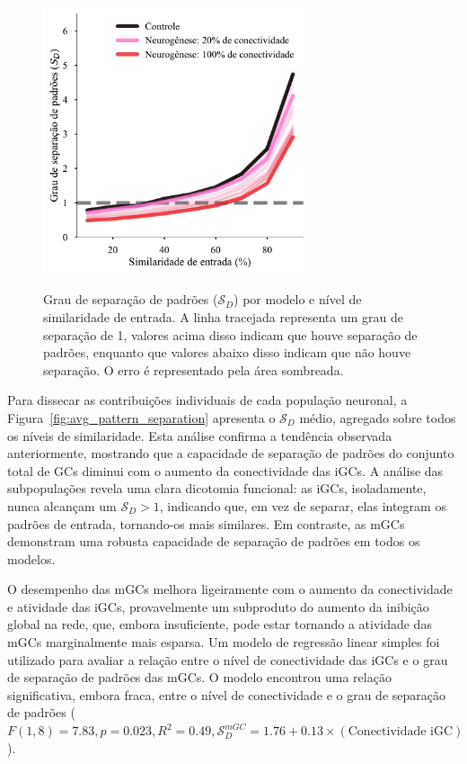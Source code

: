 \begin{figure}
    \centering
    \caption{Grau de separação de padrões ($\mathcal{S}_D$) por modelo e nível de similaridade de entrada. A linha tracejada
    representa um grau de separação de 1, valores acima disso indicam que houve separação de padrões, enquanto que valores abaixo
    disso indicam que não houve separação. O erro é representado pela área sombreada.}
    \includegraphics[width=0.7\textwidth]{figuras/plots/pattern_separation}
    \label{fig:pattern_separation}
\end{figure}

Para dissecar as contribuições individuais de cada população neuronal, a Figura~\ref{fig:avg_pattern_separation} apresenta o
$\mathcal{S}_D$ médio, agregado sobre todos os níveis de similaridade. Esta análise confirma a tendência observada anteriormente,
mostrando que a capacidade de separação de padrões do conjunto total de GCs diminui com o aumento da conectividade das iGCs. A
análise das subpopulações revela uma clara dicotomia funcional: as iGCs, isoladamente, nunca alcançam um $\mathcal{S}_D > 1$,
indicando que, em vez de separar, elas integram os padrões de entrada, tornando-os mais similares. Em contraste, as mGCs
demonstram uma robusta capacidade de separação de padrões em todos os modelos. 

O desempenho das mGCs melhora ligeiramente com o aumento da conectividade e atividade das iGCs, provavelmente um subproduto do
aumento da inibição global na rede, que, embora insuficiente, pode estar tornando a atividade das mGCs marginalmente mais esparsa.
Um modelo de regressão linear simples foi utilizado para avaliar a relação entre o nível de conectividade das iGCs e o grau de
separação de padrões das mGCs. O modelo encontrou uma relação significativa, embora fraca, entre o nível de conectividade e o grau
de separação de padrões ($F(1, 8) = 7.83, p = 0.023, R^2 = 0.49, \mathcal{S}^{mGC}_D = 1.76 + 0.13 \times (\text{Conectividade
iGC})$).

